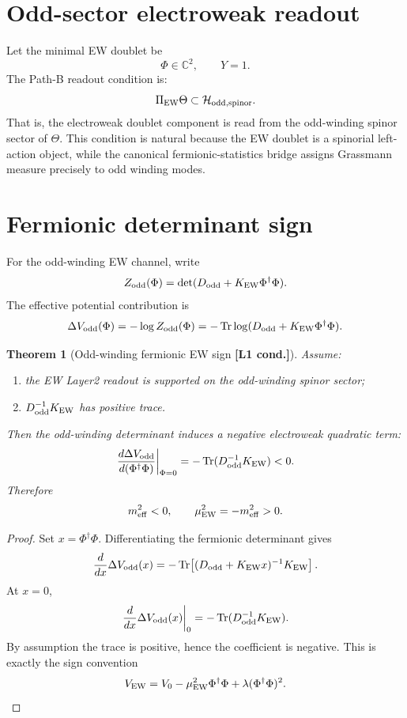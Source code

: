 \documentclass[12pt,a4paper]{article}
\newtheorem{theorem}[definition]{Theorem}
\newcommand{\Lone}{\textbf{[L1 cond.]}}
\begin{document}
\section{Odd-sector electroweak readout}

Let the minimal EW doublet be
\[
  \Phi\in\mathbb C^2,
  \qquad
  Y=1.
\]
The Path-B readout condition is:
\[
  \Pi_{\rm EW}\Theta
  \subset
  \mathcal H_{\rm odd,spinor}.
\]
That is, the electroweak doublet component is read from the odd-winding spinor
sector of \(\Theta\).  This condition is natural because the EW doublet is a
spinorial left-action object, while the canonical fermionic-statistics bridge
assigns Grassmann measure precisely to odd winding modes.

\section{Fermionic determinant sign}

For the odd-winding EW channel, write
\[
  Z_{\rm odd}(\Phi)
  =
  \det(D_{\rm odd}+K_{\rm EW}\Phi^\dagger\Phi).
\]
The effective potential contribution is
\[
  \Delta V_{\rm odd}(\Phi)
  =
  -\log Z_{\rm odd}(\Phi)
  =
  -\operatorname{Tr}\log(D_{\rm odd}+K_{\rm EW}\Phi^\dagger\Phi).
\]

\begin{theorem}[Odd-winding fermionic EW sign \Lone]
Assume:
\begin{enumerate}
  \item the EW Layer2 readout is supported on the odd-winding spinor sector;
  \item $D_{\rm odd}^{-1}K_{\rm EW}$ has positive trace.
\end{enumerate}
Then the odd-winding determinant induces a negative electroweak quadratic term:
\[
  \left.\frac{d\Delta V_{\rm odd}}{d(\Phi^\dagger\Phi)}\right|_{\Phi=0}
  =
  -\operatorname{Tr}(D_{\rm odd}^{-1}K_{\rm EW})
  <0.
\]
Therefore
\[
  m_{\rm eff}^2<0,
  \qquad
  \mu_{\rm EW}^2=-m_{\rm eff}^2>0.
\]
\end{theorem}

\begin{proof}
Set $x=\Phi^\dagger\Phi$.  Differentiating the fermionic determinant gives
\[
  \frac{d}{dx}\Delta V_{\rm odd}(x)
  =
  -\operatorname{Tr}\!\left[(D_{\rm odd}+K_{\rm EW}x)^{-1}K_{\rm EW}\right].
\]
At $x=0$,
\[
  \left.\frac{d}{dx}\Delta V_{\rm odd}(x)\right|_{0}
  =
  -\operatorname{Tr}(D_{\rm odd}^{-1}K_{\rm EW}).
\]
By assumption the trace is positive, hence the coefficient is negative.  This is
exactly the sign convention
\[
  V_{\rm EW}=V_0-\mu_{\rm EW}^2\Phi^\dagger\Phi+
  \lambda(\Phi^\dagger\Phi)^2.
\]
\end{proof}
\end{document}
